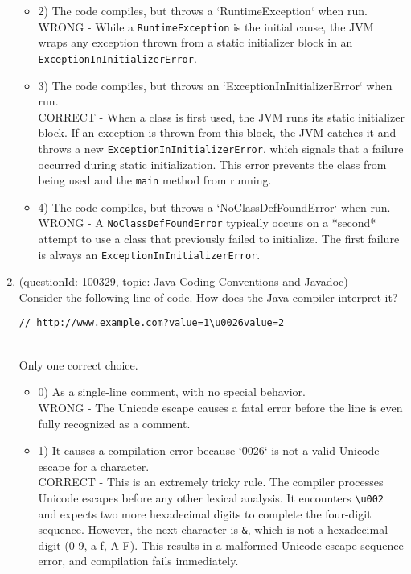 \documentclass[12pt]{article}
\begin{document}
\begin{enumerate}[label=(\arabic*)]
\begin{itemize}
\item 2) The code compiles, but throws a `RuntimeException` when run.
 \\ 
WRONG - While a \verb|RuntimeException| is the initial cause, the JVM wraps any exception thrown from a static initializer block in an \verb|ExceptionInInitializerError|.

\item 3) The code compiles, but throws an `ExceptionInInitializerError` when run.
 \\ 
CORRECT - When a class is first used, the JVM runs its static initializer block. If an exception is thrown from this block, the JVM catches it and throws a new \verb|ExceptionInInitializerError|, which signals that a failure occurred during static initialization. This error prevents the class from being used and the \verb|main| method from running.

\item 4) The code compiles, but throws a `NoClassDefFoundError` when run.
 \\ 
WRONG - A \verb|NoClassDefFoundError| typically occurs on a *second* attempt to use a class that previously failed to initialize. The first failure is always an \verb|ExceptionInInitializerError|.

\end{itemize}
\item (questionId: 100329, topic: Java Coding Conventions and Javadoc) \\ 
Consider the following line of code. How does the Java compiler interpret it?
\begin{verbatim}
// http://www.example.com?value=1\u0026value=2
\end{verbatim}
\\ \noindent Only one correct choice. 
\begin{itemize}
\item 0) As a single-line comment, with no special behavior.
 \\ 
WRONG - The Unicode escape causes a fatal error before the line is even fully recognized as a comment.

\item 1) It causes a compilation error because `\u0026` is not a valid Unicode escape for a character.
 \\ 
CORRECT - This is an extremely tricky rule. The compiler processes Unicode escapes before any other lexical analysis. It encounters \verb|\u002| and expects two more hexadecimal digits to complete the four-digit sequence. However, the next character is \verb|&|, which is not a hexadecimal digit (0-9, a-f, A-F). This results in a malformed Unicode escape sequence error, and compilation fails immediately.


\end{itemize}
\end{enumerate}
\end{document}
